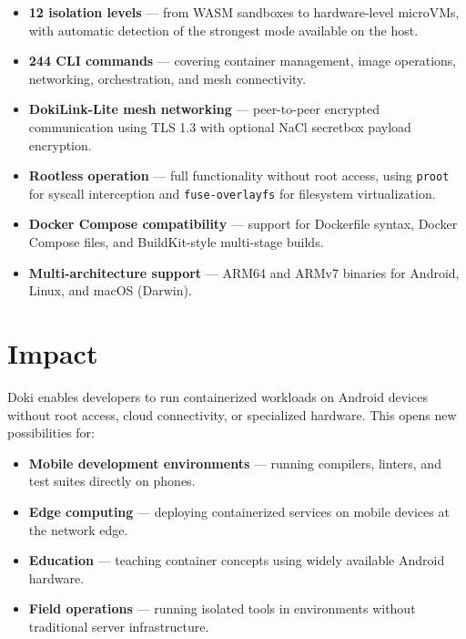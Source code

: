 \begin{itemize}[leftmargin=*, itemsep=4pt]
  \item \textbf{12 isolation levels} --- from WASM sandboxes to
        hardware-level microVMs, with automatic detection of the
        strongest mode available on the host.
  \item \textbf{244 CLI commands} --- covering container management,
        image operations, networking, orchestration, and mesh
        connectivity.
  \item \textbf{DokiLink-Lite mesh networking} --- peer-to-peer
        encrypted communication using TLS 1.3 with optional NaCl
        secretbox payload encryption.
  \item \textbf{Rootless operation} --- full functionality without
        root access, using \texttt{proot} for syscall interception
        and \texttt{fuse-overlayfs} for filesystem virtualization.
  \item \textbf{Docker Compose compatibility} --- support for
        Dockerfile syntax, Docker Compose files, and BuildKit-style
        multi-stage builds.
  \item \textbf{Multi-architecture support} --- ARM64 and ARMv7
        binaries for Android, Linux, and macOS (Darwin).
\end{itemize}

\section{Impact}
\label{sec:impact}

Doki enables developers to run containerized workloads on Android
devices without root access, cloud connectivity, or specialized
hardware. This opens new possibilities for:

\begin{itemize}[leftmargin=*, itemsep=4pt]
  \item \textbf{Mobile development environments} --- running
        compilers, linters, and test suites directly on phones.
  \item \textbf{Edge computing} --- deploying containerized services
        on mobile devices at the network edge.
  \item \textbf{Education} --- teaching container concepts using
        widely available Android hardware.
  \item \textbf{Field operations} --- running isolated tools in
        environments without traditional server infrastructure.
\end{itemize}


